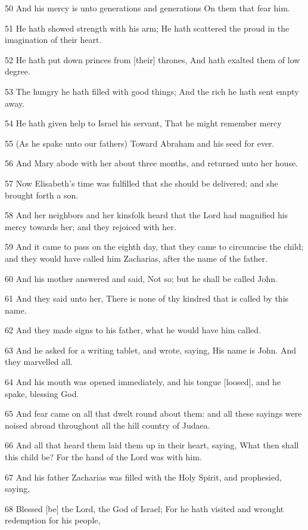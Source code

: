 \par 50 And his mercy is unto generations and generations On them that fear him.
\par 51 He hath showed strength with his arm; He hath scattered the proud in the imagination of their heart.
\par 52 He hath put down princes from [their] thrones, And hath exalted them of low degree.
\par 53 The hungry he hath filled with good things; And the rich he hath sent empty away.
\par 54 He hath given help to Israel his servant, That he might remember mercy
\par 55 (As he spake unto our fathers) Toward Abraham and his seed for ever.
\par 56 And Mary abode with her about three months, and returned unto her house.
\par 57 Now Elisabeth's time was fulfilled that she should be delivered; and she brought forth a son.
\par 58 And her neighbors and her kinsfolk heard that the Lord had magnified his mercy towards her; and they rejoiced with her.
\par 59 And it came to pass on the eighth day, that they came to circumcise the child; and they would have called him Zacharias, after the name of the father.
\par 60 And his mother answered and said, Not so; but he shall be called John.
\par 61 And they said unto her, There is none of thy kindred that is called by this name.
\par 62 And they made signs to his father, what he would have him called.
\par 63 And he asked for a writing tablet, and wrote, saying, His name is John. And they marvelled all.
\par 64 And his mouth was opened immediately, and his tongue [loosed], and he spake, blessing God.
\par 65 And fear came on all that dwelt round about them: and all these sayings were noised abroad throughout all the hill country of Judaea.
\par 66 And all that heard them laid them up in their heart, saying, What then shall this child be? For the hand of the Lord was with him.
\par 67 And his father Zacharias was filled with the Holy Spirit, and prophesied, saying,
\par 68 Blessed [be] the Lord, the God of Israel; For he hath visited and wrought redemption for his people,
